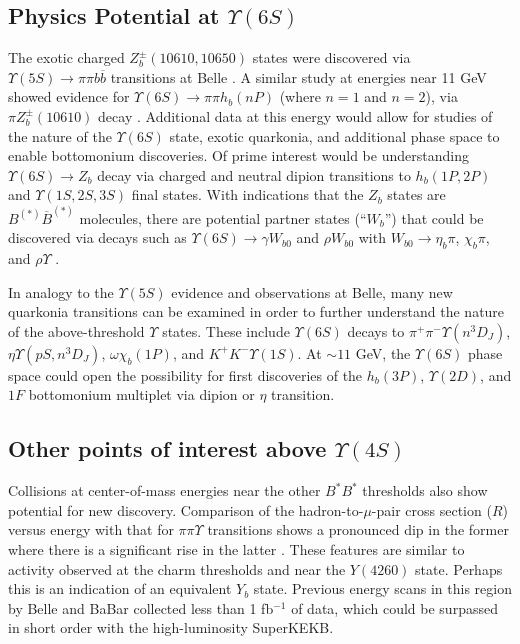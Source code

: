 \documentclass[12pt]{article}
\begin{document}
\subsection{Physics Potential at $\Upsilon(6S)$}
The exotic charged $Z_{b}^{\pm}(10610,10650)$ states were discovered via $\Upsilon(5S)\to\pi\pi b\overline{b}$ transitions at Belle \cite{bel_zb}. A similar study at energies near 11 GeV showed evidence for $\Upsilon(6S)\to\pi\pi h_{b}(nP)$ (where $n=1$ and $n=2$), via $\pi Z_{b}^{\pm}(10610)$ decay \cite{bel_y6s}. Additional data at this energy would allow for studies of the nature of the $\Upsilon(6S)$ state, exotic quarkonia, and additional phase space to enable bottomonium discoveries. Of prime interest would be understanding $\Upsilon(6S)\to Z_{b}$ decay via charged and neutral dipion transitions to $h_{b}(1P,2P)$ and $\Upsilon(1S,2S,3S)$ final states. With indications that the $Z_{b}$ states are $B^{(*)}\overline{B}^{(*)}$ molecules, there are potential partner states (``$W_{b}$'') that could be discovered via decays such as $\Upsilon(6S)\to\gamma W_{b0}$ and $\rho W_{b0}$ with $W_{b0}\to \eta_{b}\pi$, $\chi_{b}\pi$, and $\rho\Upsilon$ \cite{th_voloshin}.

In analogy to the $\Upsilon(5S)$ evidence and observations at Belle, many new quarkonia transitions can be examined in order to further understand the nature of the above-threshold $\Upsilon$ states. These include $\Upsilon(6S)$ decays to $\pi^{+}\pi^{-}\Upsilon(n^{3}D_{J})$, $\eta\Upsilon(pS,n^{3}D_{J})$, $\omega\chi_{b}(1P)$, and $K^{+}K^{-}\Upsilon(1S)$. At ${\sim}11$ GeV, the $\Upsilon(6S)$ phase space could open the possibility for first discoveries of the $h_{b}(3P)$, $\Upsilon(2D)$, and $1F$ bottomonium multiplet via dipion or $\eta$ transition.

\subsection{Other points of interest above $\Upsilon(4S)$}
Collisions at center-of-mass energies near the other $B^{*}B^{*}$ thresholds also show potential for new discovery. Comparison of the hadron-to-$\mu$-pair cross section ($R$) versus energy with that for $\pi\pi\Upsilon$ transitions shows a pronounced dip \cite{bbr_scan} in the former where there is a significant rise in the latter \cite{bel_scan}. These features are similar to activity observed at the charm thresholds and near the $Y(4260)$ state. Perhaps this is an indication of an equivalent $Y_{b}$ state. Previous energy scans in this region by Belle and BaBar collected less than 1 fb$^{-1}$ of data, which could be surpassed in short order with the high-luminosity SuperKEKB.
\end{document}
